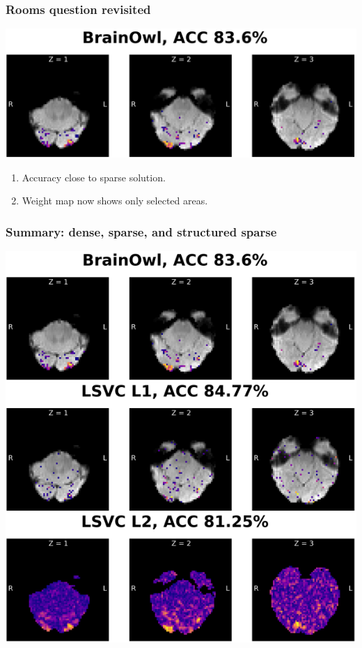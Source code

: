 \documentclass[11pt]{beamer}
\begin{document}
\begin{frame}
    \frametitle{Rooms question revisited}

    \vspace*{-2cm}

    \begin{center}
        \includegraphics[scale=0.7]{figures/brainowl-axial.png}
    \end{center}

    \begin{enumerate}
        \item Accuracy close to sparse solution.
        \item Weight map now shows only selected areas.
    \end{enumerate}

\end{frame}

\begin{frame}
    \frametitle{Summary: dense, sparse, and structured sparse}

    \begin{center}
        \includegraphics[scale=0.45]{figures/dense_sparse_structured-sparse.png}
    \end{center}
\end{frame}
\end{document}

